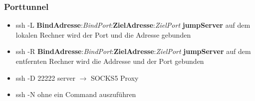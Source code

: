 \begin{frame}
\frametitle{Porttunnel}
\begin{itemize}
\item ssh -L \textbf{BindAdresse}:\textit{BindPort}:\textbf{ZielAdresse}:\textit{ZielPort} \textbf{jumpServer} auf dem lokalen Rechner wird der Port und die Adresse gebunden

\item ssh -R \textbf{BindAdresse}:\textit{BindPort}:\textbf{ZielAdresse}:\textit{ZielPort} \textbf{jumpServer} auf dem entfernten Rechner wird die Addresse und der Port gebunden

\item ssh -D 22222 server 	$\rightarrow$ SOCKS5 Proxy

\item ssh -N ohne ein Command auszuführen
\end{itemize}
\end{frame}